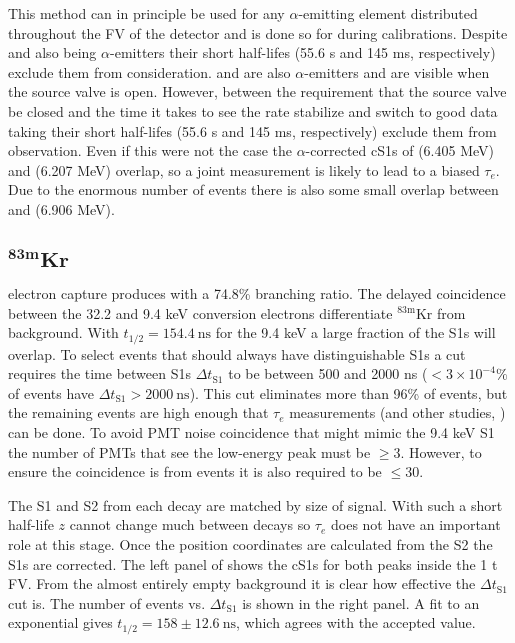 This method can in principle be used for any $\alpha$-emitting element distributed throughout the FV of the detector and is done so
for  during  calibrations.  Despite  and  also being $\alpha$-emitters their short
half-lifes (55.6 s and 145 ms, respectively) exclude them from consideration.   and  are also $\alpha$-emitters
and are visible when the source valve is open.  However, between the requirement that the source valve be closed and the time it takes to
see
the rate stabilize and switch to good data taking their short half-lifes (55.6 s and 145 ms, respectively) exclude them from
observation.  Even if this were not the case the $\alpha$-corrected cS1s of  (6.405 MeV) and  (6.207 MeV)
overlap, so a joint
measurement is likely to lead to a biased $\tau_e$.  Due to the enormous number of events there is also some small overlap between
 and  (6.906 MeV).



\subsection[$\mathrm{^{83m}Kr}$][$\mathrm{^{83m}Kr}$]{$\mathbf{^{83m}Kr}$}
\label{subsec:electron_lifetimes_measurement_kr}
 electron capture produces \metakr with a 74.8\% branching ratio.  The delayed coincidence between the 32.2 and 9.4 keV
conversion electrons differentiate $\mathrm{^{83m}Kr}$ from background.  With
$t_{1/2} = 154.4\ \mathrm{ns}$ for the 9.4 keV a large fraction of the S1s will overlap.  To select events that should always have
distinguishable S1s a cut requires
the time between S1s $\Delta t_{\mathrm{S1}}$ to be between 500 and 2000 ns ($< 3 \times 10^{-4}\%$ of events have
$\Delta t_{\mathrm{S1}} > 2000\ \mathrm{ns}$).  This cut eliminates more than 96\% of \metakr events, but the remaining events are high
enough that $\tau_e$ measurements (and other studies, ) can be done.  To avoid PMT noise coincidence that might mimic
the 9.4 keV S1
the number of PMTs that see the low-energy peak must be $\geq 3$.  However, to ensure the coincidence is from \metakr events it is also
required to be $\leq 30$.

The S1 and S2 from each decay are matched by size of signal.  With such a short half-life $z$ cannot change much between decays so
$\tau_e$ does not have an important role at this stage.  Once the position coordinates are calculated from the S2 the S1s are
corrected.  The left panel of  shows the cS1s for both peaks inside the
1 t FV.  From the
almost entirely empty background it is clear how effective the $\Delta t_{\mathrm{S1}}$ cut is.  The number of events vs.
$\Delta t_{\mathrm{S1}}$ is shown in the right panel.  A fit to an exponential gives $t_{1/2} = 158 \pm 12.6\ \mathrm{ns}$, which
agrees with the accepted value.

